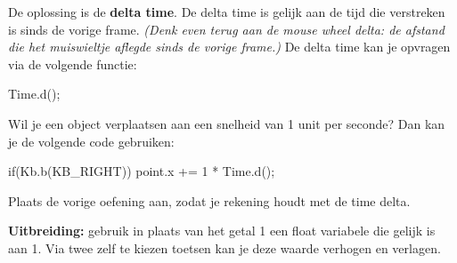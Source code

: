 De oplossing is de \textbf{delta time}. De delta time is gelijk aan de tijd die verstreken is sinds de vorige frame. \textsl{(Denk even terug aan de mouse wheel delta: de afstand die het muiswieltje aflegde sinds de vorige frame.)} De delta time kan je opvragen via de volgende functie:

\begin{code}
Time.d();
\end{code}

Wil je een object verplaatsen aan een snelheid van 1 unit per seconde? Dan kan je de volgende code gebruiken:

\begin{code}
if(Kb.b(KB_RIGHT)) point.x += 1 * Time.d();
\end{code}

\begin{exercise}
Plaats de vorige oefening aan, zodat je rekening houdt met de time delta.

\textbf{Uitbreiding:} gebruik in plaats van het getal 1 een float variabele die gelijk is aan 1. Via twee zelf te kiezen toetsen kan je deze waarde verhogen en verlagen.
\end{exercise}




